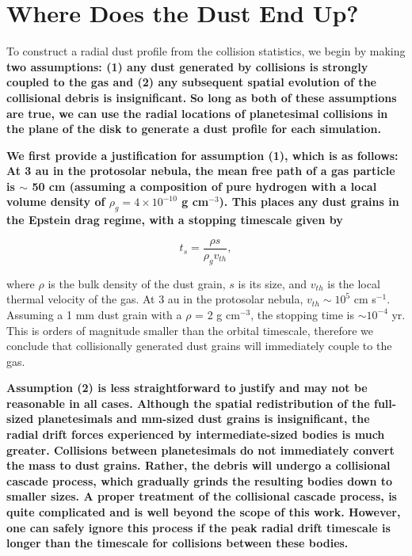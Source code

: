 \documentclass[fleqn,usenatbib]{mnras}
\begin{document}
\section{Where Does the Dust End Up?}\label{sec:dust}

To construct a radial dust profile from the collision statistics, we begin by making \textbf{two assumptions: (1) any dust generated by collisions is strongly coupled to the gas and (2) any 
subsequent spatial evolution of the collisional debris is insignificant.} \textbf{So long as both of these assumptions are true, we can use the radial locations of planetesimal collisions in the 
plane of the disk to generate a dust profile for each simulation.}

\textbf{We first provide a justification for assumption (1), which is as follows: At 3 au in the protosolar nebula, the mean free path of a gas particle is $\sim$ 50 cm (assuming a composition 
of pure hydrogen with a local volume density of $\rho_{g} = 4 \times 10^{-10}$ g cm$^{-3}$). This places any dust grains in the Epstein drag regime, with a stopping timescale given by}

\begin{equation}\label{eq:ts_epstein}
    t_{s} = \frac{\rho s}{\rho_{g} v_{th}},
\end{equation}

\noindent where $\rho$ is the bulk density of the dust grain, $s$ is its size, and $v_{th}$ is the local thermal velocity of the gas. At 3 au in the protosolar nebula, $v_{th} \sim 10^{5}$ cm 
s$^{-1}$. Assuming a 1 mm dust grain with a $\rho$ = 2 g cm$^{-3}$, the stopping time is $\sim 10^{-4}$ yr.  This is orders of magnitude smaller than the 
orbital timescale, therefore we conclude that collisionally generated dust grains will immediately couple to the gas.

\textbf{Assumption (2) is less straightforward to justify and may not be reasonable in all cases. Although the spatial redistribution of the full-sized planetesimals and mm-sized dust grains 
is insignificant, the radial drift forces experienced by intermediate-sized bodies is much greater. Collisions between planetesimals do not immediately convert the mass to dust grains. 
Rather, the debris will undergo a collisional cascade process, which gradually grinds the resulting bodies down to smaller sizes. A proper treatment of the collisional cascade process, is 
quite complicated and is well beyond the scope of this work. However, one can safely ignore this process if the peak radial drift timescale is longer than the timescale for collisions 
between these bodies.}
\end{document}
